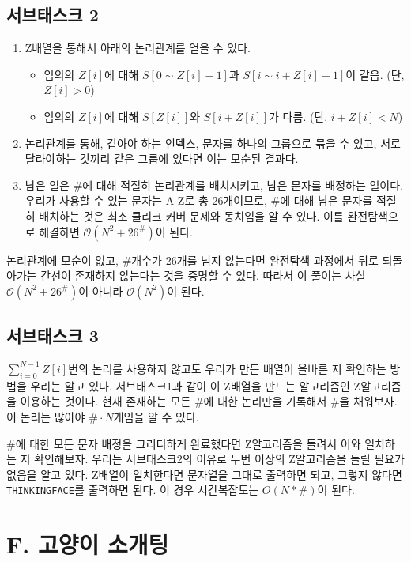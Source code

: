 \documentclass{article}
\begin{document}
	\subsection{서브태스크 2}
	\begin{enumerate}
		\item Z배열을 통해서 아래의 논리관계를 얻을 수 있다.
		\begin{itemize}
			\item 임의의 $Z[i]$에 대해 $S[0 \sim Z[i]-1]$과 $S[i \sim i+Z[i]-1]$이 같음. (단, $Z[i] > 0$)
			\item 임의의 $Z[i]$에 대해 $S[Z[i]]$와 $S[i + Z[i]]$가 다름. (단, $i + Z[i] < N$)
		\end{itemize}
		\item 논리관계를 통해, 같아야 하는 인덱스, 문자를 하나의 그룹으로 묶을 수 있고, 서로 달라야하는 것끼리 같은 그룹에 있다면 이는 모순된 결과다.
		\item 남은 일은 \#에 대해 적절히 논리관계를 배치시키고, 남은 문자를 배정하는 일이다. 우리가 사용할 수 있는 문자는 A-Z로 총 26개이므로, \#에 대해 남은 문자를 적절히 배치하는 것은 최소 클리크 커버 문제와 동치임을 알 수 있다. 이를 완전탐색으로 해결하면 $\mathcal{O}(N^2 + 26^\#)$이 된다.
	\end{enumerate}
	논리관계에 모순이 없고, \#개수가 26개를 넘지 않는다면 완전탐색 과정에서 뒤로 되돌아가는 간선이 존재하지 않는다는 것을 증명할 수 있다. 따라서 이 풀이는 사실 $\mathcal{O}(N^2 + 26^\#)$이 아니라 $\mathcal{O}(N^2)$이 된다.
	
	\subsection{서브태스크 3}
	$\sum_{i=0}^{N-1} Z[i]$번의 논리를 사용하지 않고도 우리가 만든 배열이 올바른 지 확인하는 방법을 우리는 알고 있다. 서브태스크1과 같이 이 Z배열을 만드는 알고리즘인 Z알고리즘을 이용하는 것이다. 현재 존재하는 모든 \#에 대한 논리만을 기록해서 \#을 채워보자. 이 논리는 많아야 $\# \cdot N$개임을 알 수 있다. \newline
	
	\#에 대한 모든 문자 배정을 그리디하게 완료했다면 Z알고리즘을 돌려서 이와 일치하는 지 확인해보자. 우리는 서브태스크2의 이유로 두번 이상의 Z알고리즘을 돌릴 필요가 없음을 알고 있다. Z배열이 일치한다면 문자열을 그대로 출력하면 되고, 그렇지 않다면 \texttt{THINKINGFACE}를 출력하면 된다. 이 경우 시간복잡도는 $O(N * \#)$이 된다.
	
		
	\newpage
	\section{F. 고양이 소개팅}
	
\end{document}
